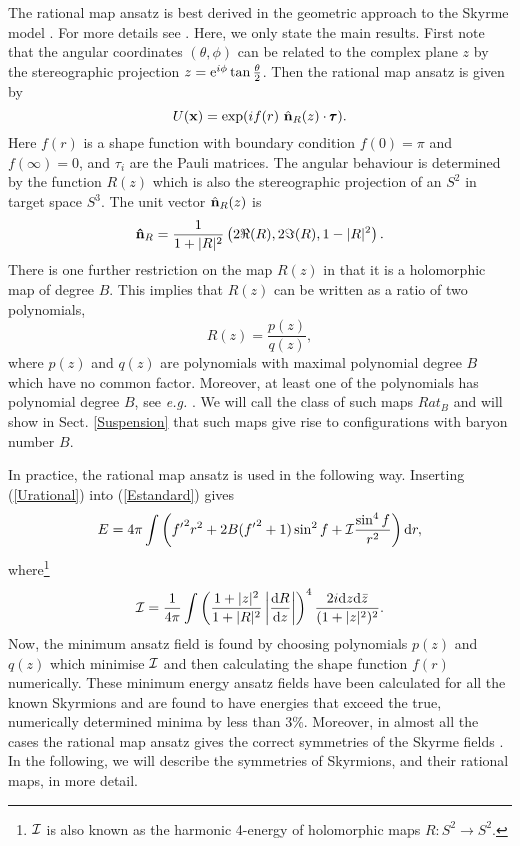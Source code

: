 \documentclass[a4paper,12pt]{article}
\def\vectau{{\pmb{\tau}}}
\begin{document}
The rational map ansatz is best derived in the geometric approach 
to the Skyrme model \cite{Manton:1987xt}. For more details see
\cite{Houghton:1998kg, Krusch:2000gb}. Here, we only state the main 
results.
%
First note that the angular coordinates $(\theta, \phi)$ can be
related  to the complex plane $z$ by the stereographic projection 
$z={\rm e}^{i \phi}  \tan \frac{\theta}{2}$. Then the rational map 
ansatz is given by
%
\begin{equation}
\label{Urational}
U({\bf x}) = \exp (i f(r)\ {\hat {\bf n}}_R(z) \cdot \vectau).
\end{equation}
%
Here $f(r)$ is a shape function with boundary condition $f(0) = \pi$
and  $f(\infty) = 0$, and $\tau_i$ are the Pauli matrices. The
angular  behaviour is determined by the function  $R(z)$ which is 
also the stereographic projection of an $S^2$ in target space 
$S^3$. The unit vector ${\hat {\bf n}}_R(z)$ is  
% 
\begin{equation}
\label{normalR}
{\bf {\hat n}}_R = \frac{1}{1 + |R|^2} \left( 2 \Re(R), 2 \Im(R), 1 -
|R|^2 \right).
\end{equation}
%
There is one further restriction on the map $R(z)$ in that it is a
holomorphic map of degree $B$. This implies that $R(z)$ can be written
as  a ratio of two polynomials,
%
\begin{equation}
R(z) = \frac{p(z)}{q(z)},
\end{equation} 
%
where $p(z)$ and $q(z)$ are polynomials with maximal polynomial degree
$B$ which have no common factor.  Moreover, at least one of the 
polynomials has polynomial degree $B$, see {\it e.g.} 
\cite{Jarvis:1996}. We will call the class of such maps 
$Rat_B$ and will show in Sect. \ref{Suspension} 
that such maps give rise to configurations with baryon
number $B$.

In practice, the rational map ansatz is used in the following way.
Inserting (\ref{Urational}) into (\ref{Estandard}) gives 
%
\begin{equation}
\label{Erational}
E = 4 \pi \int  \left( {f^\prime}^2 r^2 + 2 B ({f^\prime}^2 + 1)
\sin^2 f  + {\cal I} \frac{\sin^4 f}{r^2} \right) {\rm d} r,
\end{equation}
%
where\footnote{${\cal I}$ is also known as the harmonic 4-energy of 
holomorphic maps $R: S^2 \to S^2$.}
%
\begin{equation}
{\cal I} = \frac{1}{4 \pi} \int \left( \frac{1 + |z|^2}{1 +|R|^2}
\left|\frac{{\rm d} R}{{\rm d} z} \right| \right)^4 \frac{ 2 i {\rm
d}z {\rm d} {\bar z}}{(1+|z|^2)^2}.
\end{equation}
%
Now, the minimum ansatz field is found by choosing polynomials $p(z)$
and  $q(z)$ which minimise ${\cal I}$ and then calculating the shape
function  $f(r)$ numerically.  These minimum energy ansatz fields have
been calculated for all the known Skyrmions and are found to have
energies that exceed the true, numerically determined minima by less
than $3 \%$. Moreover, in almost all the cases the rational map ansatz
gives the correct symmetries of the Skyrme fields
\cite{Battye:2000se}. In the following, we will describe the symmetries of 
Skyrmions, and their rational maps, in more detail.
\end{document}
